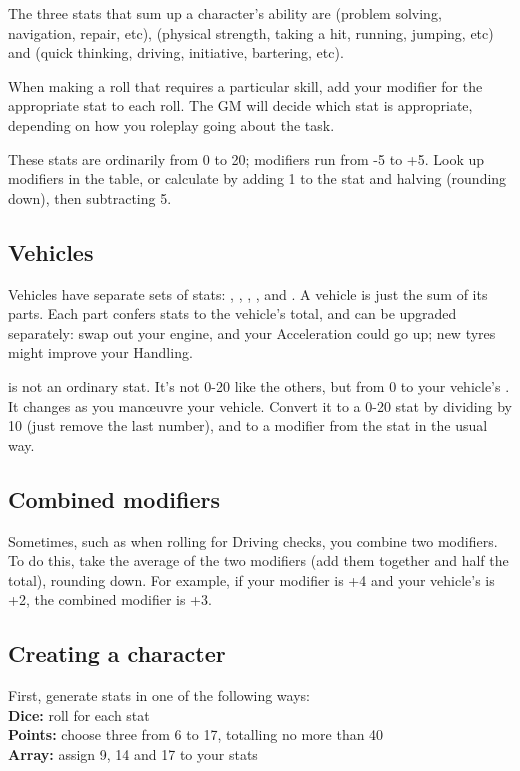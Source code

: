\documentclass[10pt, a4paper, twocolumn]{article}
\begin{document}
The three stats that sum up a character's ability are  (problem
solving, navigation, repair,  etc),  (physical strength, taking a
hit, running, jumping, etc) and  (quick thinking, driving,
initiative, bartering, etc).

When making a roll that requires a particular skill, add your modifier for the
appropriate stat to each roll. The GM will decide which stat is appropriate,
depending on how you roleplay going about the task.

These stats are ordinarily from 0 to 20; modifiers run from -5 to +5. Look up
modifiers in the table, or calculate by adding 1 to the stat and halving
(rounding down), then subtracting 5.

\subsection{Vehicles}
Vehicles have separate sets of stats: , ,
, ,  and . A vehicle
is just the sum of its parts. Each part confers stats to the vehicle's total,
and can be upgraded separately: swap out your engine, and your Acceleration
could go up; new tyres might improve your Handling. 

 is not an ordinary stat. It's not 0-20 like the others, but from 0
to your vehicle's . It changes as you man\oe{}uvre your
vehicle. Convert it to a 0-20 stat by dividing by 10 (just remove the last
number), and to a modifier from the stat in the usual way.

\subsection{Combined modifiers}
Sometimes, such as when rolling for Driving checks, you combine two
modifiers. To do this, take the average of the two modifiers (add them
together and half the total), rounding down. For example, if your 
modifier is +4 and your vehicle's  is +2, the combined modifier
is +3.

\subsection{Creating a character}
First, generate stats in one of the following ways:\\
\textbf{Dice:} roll  for each stat\\
\textbf{Points:} choose three from 6 to 17, totalling no more than 40\\
\textbf{Array:} assign 9, 14 and 17 to your stats
\end{document}
